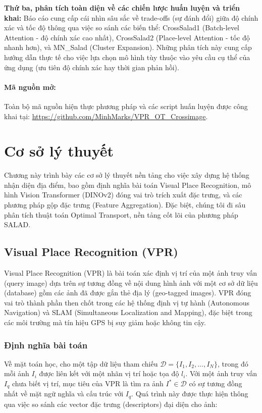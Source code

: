 \documentclass[12pt,a4paper]{article}
\begin{document}
    \textbf{Thứ ba, phân tích toàn diện về các chiến lược huấn luyện và triển khai:} Báo cáo cung cấp cái nhìn sâu sắc về trade-offs (sự đánh đổi) giữa độ chính xác và tốc độ thông qua việc so sánh các biến thể: CrossSalad1 (Batch-level Attention - độ chính xác cao nhất), CrossSalad2 (Place-level Attention - tốc độ nhanh hơn), và MN\_Salad (Cluster Expansion). Những phân tích này cung cấp hướng dẫn thực tế cho việc lựa chọn mô hình tùy thuộc vào yêu cầu cụ thể của ứng dụng (ưu tiên độ chính xác hay thời gian phản hồi).
    
    \paragraph{Mã nguồn mở:} Toàn bộ mã nguồn hiện thực phương pháp và các script huấn luyện được công khai tại: \url{https://github.com/MinhMarks/VPR_OT_Crossimage}.

    \section{Cơ sở lý thuyết}

    Chương này trình bày các cơ sở lý thuyết nền tảng cho việc xây dựng hệ thống nhận diện địa điểm, bao gồm định nghĩa bài toán Visual Place Recognition, mô hình Vision Transformer (DINOv2) đóng vai trò trích xuất đặc trưng, và các phương pháp gộp đặc trưng (Feature Aggregation). Đặc biệt, chúng tôi đi sâu phân tích thuật toán Optimal Transport, nền tảng cốt lõi của phương pháp SALAD.

    \subsection{Visual Place Recognition (VPR)}

    Visual Place Recognition (VPR) là bài toán xác định vị trí của một ảnh truy vấn (query image) dựa trên sự tương đồng về nội dung hình ảnh với một cơ sở dữ liệu (database) gồm các ảnh đã được gắn thẻ địa lý (geo-tagged images). VPR đóng vai trò thành phần then chốt trong các hệ thống định vị tự hành (Autonomous Navigation) và SLAM (Simultaneous Localization and Mapping), đặc biệt trong các môi trường mà tín hiệu GPS bị suy giảm hoặc không tin cậy.

    \subsubsection{Định nghĩa bài toán}

    Về mặt toán học, cho một tập dữ liệu tham chiếu $\mathcal{D} = \{I_1, I_2, ..., I_N\}$, trong đó mỗi ảnh $I_i$ được liên kết với một nhãn vị trí hoặc tọa độ $l_i$. Với một ảnh truy vấn $I_q$ chưa biết vị trí, mục tiêu của VPR là tìm ra ảnh $I^* \in \mathcal{D}$ có sự tương đồng nhất về mặt ngữ nghĩa và cấu trúc với $I_q$. Quá trình này được thực hiện thông qua việc so sánh các vector đặc trưng (descriptors) đại diện cho ảnh:
\end{document}
